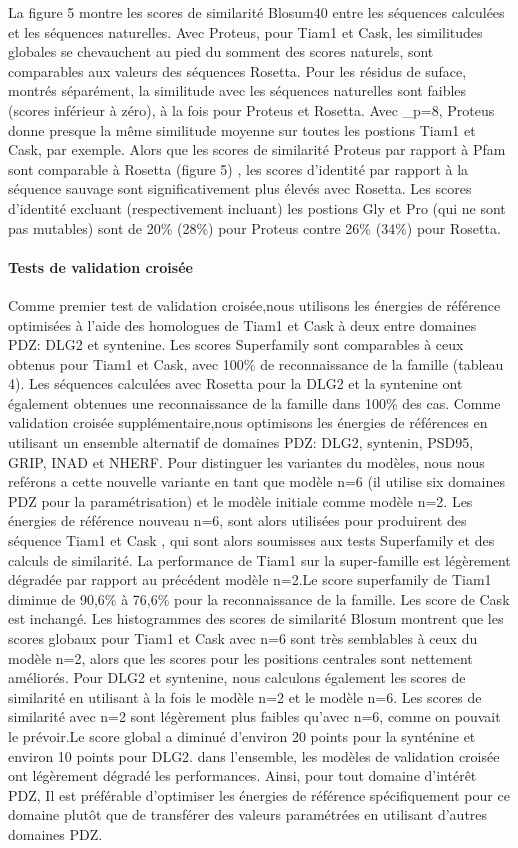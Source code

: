 \begin{enumarete}
La figure 5 montre les scores de similarité Blosum40 entre les séquences calculées et les séquences naturelles. Avec Proteus, pour Tiam1 et Cask, les similitudes globales se chevauchent au pied du somment des scores naturels, sont comparables aux valeurs des séquences Rosetta. Pour les résidus de suface, montrés séparément, la similitude avec les séquences naturelles sont faibles (scores inférieur à zéro), à la fois pour Proteus et Rosetta. Avec \epsilon_p=8, Proteus donne presque la même similitude moyenne sur toutes les postions Tiam1 et Cask, par exemple.
Alors que les scores de similarité Proteus par rapport à Pfam  sont comparable à Rosetta (figure 5) , les scores d'identité par rapport à la séquence sauvage sont significativement plus élevés avec Rosetta. Les scores d'identité excluant (respectivement incluant) les postions Gly et Pro (qui ne sont pas mutables) sont de 20\% (28\%) pour Proteus contre 26\% (34\%) pour Rosetta.

\paragraph{Tests de validation croisée}
Comme premier test de validation croisée,nous utilisons les énergies de référence optimisées à l'aide des homologues de Tiam1 et Cask à deux entre domaines PDZ: DLG2 et syntenine. Les scores Superfamily sont comparables à ceux obtenus pour Tiam1 et Cask, avec 100\% de reconnaissance de la famille (tableau 4). Les séquences calculées avec Rosetta pour la DLG2 et la syntenine ont également obtenues une reconnaissance  de la famille dans 100\% des cas. Comme validation croisée supplémentaire,nous optimisons les énergies de références en utilisant un ensemble alternatif de domaines PDZ: DLG2, syntenin,
PSD95, GRIP, INAD et NHERF. Pour distinguer les variantes du modèles, nous nous reférons a cette nouvelle variante en tant que modèle n=6 (il utilise six domaines PDZ pour la paramétrisation) et le modèle initiale comme modèle n=2. Les énergies de référence  nouveau n=6,  sont alors utilisées pour produirent des séquence Tiam1 et Cask , qui sont alors soumisses aux tests Superfamily et des calculs de similarité. La performance de Tiam1 sur la super-famille est légèrement dégradée par rapport au précédent modèle n=2.Le score superfamily de Tiam1 diminue de 90,6\% à 76,6\% pour la reconnaissance de la famille. Les score de Cask est inchangé. Les histogrammes des scores de similarité Blosum montrent que les scores globaux pour Tiam1 et Cask avec n=6 sont très semblables à ceux du modèle n=2, alors que les scores pour les positions centrales sont nettement améliorés. Pour DLG2 et syntenine, nous calculons également les scores de similarité en utilisant à la fois le modèle n=2 et le modèle n=6. Les scores de similarité avec n=2 sont légèrement plus faibles qu'avec n=6, comme on pouvait le prévoir.Le score global a diminué d'environ 20 points pour la synténine et environ 10 points pour DLG2. dans l'ensemble, les modèles de validation croisée ont légèrement dégradé les performances. Ainsi, pour tout domaine d'intérêt PDZ, Il est préférable d'optimiser les énergies de référence spécifiquement pour ce domaine plutôt que de transférer des valeurs paramétrées en utilisant d'autres domaines PDZ. 


\end{enumarete}

